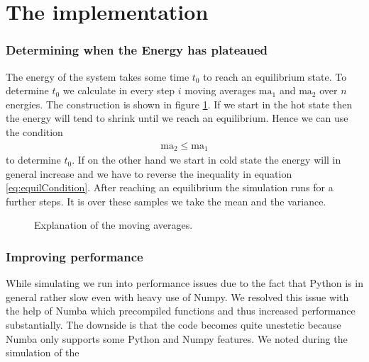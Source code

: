 \section{The implementation}

\subsubsection{Determining when the Energy has plateaued}

The energy of the system takes some time $t_0$ to reach an equilibrium state. To determine $t_0$ we calculate in every step $i$ moving averages $\text{ma}_1$ and $\text{ma}_2$ over $n$ energies. The construction is shown in figure \ref{fi:movingAverages}. If we start in the hot state then the energy will tend to shrink until we reach an equilibrium. Hence we can use the condition
\begin{align}
	\text{ma}_2 \leq \text{ma}_1 \label{eq:equilCondition}
\end{align}
to determine $t_0$. If on the other hand we start in cold state the energy will in general increase and we have to reverse the inequality in equation \eqref{eq:equilCondition}. After reaching an equilibrium the simulation runs for a further  steps. It is over these samples we take the mean and the variance.

\begin{figure}
\centering

\caption{Explanation of the moving averages.}
\label{fi:movingAverages}
\end{figure}

\subsubsection{Improving performance}
While simulating we run into performance issues due to the fact that Python is in general rather slow even with heavy use of Numpy. We resolved this issue with the help of Numba which precompiled functions and thus increased performance substantially. The downside is that the code becomes quite unestetic because Numba only supports some Python and Numpy features. We noted during the simulation of the 


\begin{figure}
\centering

\end{figure}

\begin{figure}
\centering

\end{figure}

